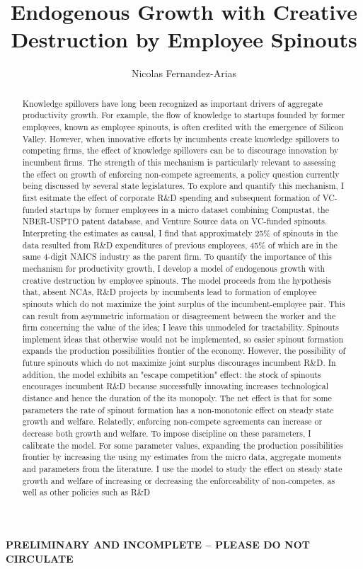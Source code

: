 \documentclass[11pt,english]{article}
\theoremstyle{remark}
\begin{document}
	
\title{Endogenous Growth with Creative Destruction by Employee Spinouts}
\author{Nicolas Fernandez-Arias}
\maketitle


\textbf{PRELIMINARY AND INCOMPLETE -- PLEASE DO NOT CIRCULATE}

\begin{abstract}
	Knowledge spillovers have long been recognized as important drivers of aggregate productivity growth. For example, the flow of knowledge to startups founded by former employees, known as employee spinouts, is often credited with the emergence of Silicon Valley. However, when innovative efforts by incumbents create knowledge spillovers to competing firms, the effect of knowledge spillovers can be to discourage innovation by incumbent firms. The strength of this mechanism is particularly relevant to assessing the effect on growth of enforcing non-compete agreements, a policy question currently being discussed by several state legislatures. To explore and quantify this mechanism, I first esitmate the effect of corporate R\&D spending and subsequent formation of VC-funded startups by former employees in a micro dataset combining Compustat, the NBER-USPTO patent database, and Venture Source data on VC-funded spinouts. Interpreting the estimates as causal, I find that approximately 25\% of spinouts in the data resulted from R\&D expenditures of previous employees, 45\% of which are in the same 4-digit NAICS industry as the parent firm. To quantify the importance of this mechanism for productivity growth, I develop a model of endogenous growth with creative destruction by employee spinouts. The model proceeds from the hypothesis that, absent NCAs, R\&D projects by incumbents lead to formation of employee spinouts which do not maximize the joint surplus of the incumbent-employee pair. This can result from asymmetric information or disagreement between the worker and the firm concerning the value of the idea; I leave this unmodeled for tractability. Spinouts implement ideas that otherwise would not be implemented, so easier spinout formation expands the production possibilities frontier of the economy. However, the possibility of future spinouts which do not maximize joint surplus discourages incumbent R\&D. In addition, the model exhibits an "escape competition" effect: the stock of spinouts encourages incumbent R\&D because successfully innovating increases technological distance and hence the duration of the its monopoly. The net effect is that for some parameters the rate of spinout formation has a non-monotonic effect on steady state growth and welfare. Relatedly, enforcing non-compete agreements can increase or decrease both growth and welfare. To impose discipline on these parameters, I calibrate the model. For some parameter values, expanding the production possibilities frontier by increasing the using my estimates from the micro data, aggregate moments and parameters from the literature. I use the model to study the effect on steady state growth and welfare of increasing or decreasing the enforceability of non-competes, as well as other policies such as R\&D 
\end{abstract}
\end{document}
